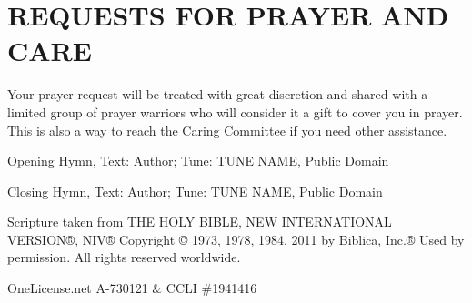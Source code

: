 \section*{REQUESTS FOR PRAYER AND CARE}

Your prayer request will be treated with great discretion and shared with a limited group of prayer
warriors who will consider it a gift to cover you in prayer. This is also a way to reach the Caring
Committee if you need other assistance.

\vfill

\small
Opening Hymn, Text: Author; Tune: TUNE NAME, Public Domain

Closing Hymn, Text: Author; Tune: TUNE NAME, Public Domain

Scripture taken from THE HOLY BIBLE, NEW INTERNATIONAL VERSION®, NIV® Copyright © 1973, 1978, 1984, 2011 by Biblica, Inc.®
Used by permission. All rights reserved worldwide.

OneLicense.net A-730121 \& CCLI \#1941416
\normalsize
